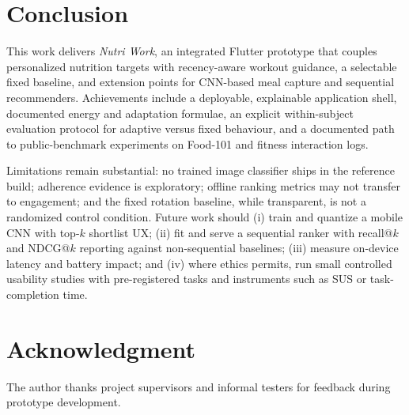 \documentclass[conference]{IEEEtran}
\begin{document}
\section{Conclusion}
This work delivers \emph{Nutri Work}, an integrated Flutter prototype that couples personalized nutrition targets with recency-aware workout guidance, a selectable fixed baseline, and extension points for CNN-based meal capture and sequential recommenders. Achievements include a deployable, explainable application shell, documented energy and adaptation formulae, an explicit within-subject evaluation protocol for adaptive versus fixed behaviour, and a documented path to public-benchmark experiments on Food-101 and fitness interaction logs.

Limitations remain substantial: no trained image classifier ships in the reference build; adherence evidence is exploratory; offline ranking metrics may not transfer to engagement; and the fixed rotation baseline, while transparent, is not a randomized control condition. Future work should (i) train and quantize a mobile CNN with top-$k$ shortlist UX; (ii) fit and serve a sequential ranker with recall@$k$ and NDCG@$k$ reporting against non-sequential baselines; (iii) measure on-device latency and battery impact; and (iv) where ethics permits, run small controlled usability studies with pre-registered tasks and instruments such as SUS or task-completion time.

\section*{Acknowledgment}
The author thanks project supervisors and informal testers for feedback during prototype development.



\end{document}

